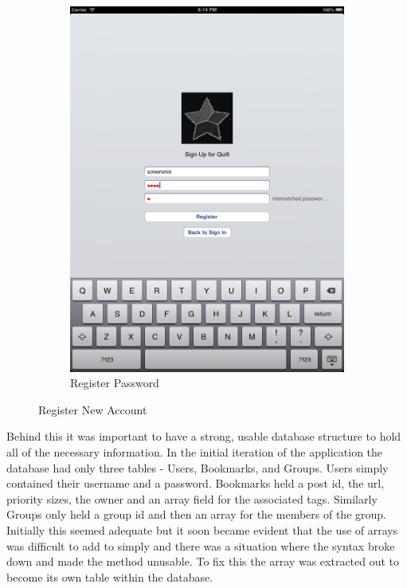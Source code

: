\documentclass[a4wide, 10pt]{article}
\begin{document}
\begin{figure}
\begin{subfigure}[b]{0.4\textwidth}
                \includegraphics[width=\textwidth]{"screenshots/Incorrect Pass"}
                \caption{Register Password}
        \end{subfigure}
        \caption{Register New Account}\label{fig:login}
\end{figure}

Behind this it was important to have a strong, usable database structure to hold all of the necessary information. In the initial iteration of the application the database had only three tables - Users, Bookmarks, and Groups. Users simply contained their username and a password. Bookmarks held a post id, the url, priority sizes, the owner and an array field for the associated tags. Similarly Groups only held a group id and then an array for the members of the group. Initially this seemed adequate but it soon became evident that the use of arrays was difficult to add to simply and there was a situation where the syntax broke down and made the method unusable. To fix this the array was extracted out to become its own table within the database. 
\end{document}
